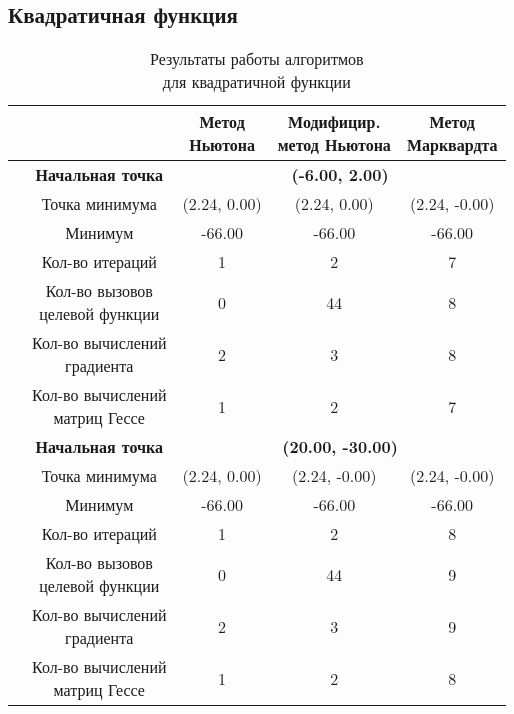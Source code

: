 \subsection{Квадратичная функция}

\begin{table}[H]
        \centering
        \vspace*{-1.5em}
        \caption{Результаты работы алгоритмов\\для квадратичной функции}
        \footnotesize
        \begin{tabular}{|c|c|c|c|c|}
        \hline
        & &\makecell{Метод\\Ньютона} &\makecell{Модифицир.\\метод Ньютона} &\makecell{Метод\\Марквардта} \\
        \hline
	\multirow{12}{*}{\rotatebox[origin=c]{90}{$\varepsilon = 0.01$}}&\textbf{Начальная точка} &\multicolumn{3}{c|}{\textbf{(-6.00, 2.00)}}\\
	\cline{2-5}
	&Точка минимума &(2.24, 0.00) &(2.24, 0.00) &(2.24, -0.00) \\ 
	\cline{2-5}
	&Минимум &-66.00 &-66.00 &-66.00 \\ 
	\cline{2-5}
	&Кол-во итераций &1 &2 &7 \\ 
	\cline{2-5}
	&\makecell{Кол-во вызовов\\целевой функции} &0 &44 &8 \\ 
	\cline{2-5}
	&\makecell{Кол-во вычислений\\градиента} &2 &3 &8 \\ 
	\cline{2-5}
	&\makecell{Кол-во вычислений\\матриц Гессе} &1 &2 &7 \\ 
	\cline{2-5}
\cline{2-5}&\textbf{Начальная точка} &\multicolumn{3}{c|}{\textbf{(20.00, -30.00)}}\\
	\cline{2-5}
	&Точка минимума &(2.24, 0.00) &(2.24, -0.00) &(2.24, -0.00) \\ 
	\cline{2-5}
	&Минимум &-66.00 &-66.00 &-66.00 \\ 
	\cline{2-5}
	&Кол-во итераций &1 &2 &8 \\ 
	\cline{2-5}
	&\makecell{Кол-во вызовов\\целевой функции} &0 &44 &9 \\ 
	\cline{2-5}
	&\makecell{Кол-во вычислений\\градиента} &2 &3 &9 \\ 
	\cline{2-5}
	&\makecell{Кол-во вычислений\\матриц Гессе} &1 &2 &8 \\ 

\end{tabular}
\end{table}
